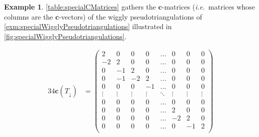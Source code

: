 \documentclass{amsart}
\theoremstyle{definition}
\newtheorem{example}[theorem]{Example}
\renewcommand{\b}[1]{{\boldsymbol{#1}}} %
\newcommand{\ie}{\textit{i.e.}~} %
\begin{document}
\begin{example}
\label{exm:specialCMatrices}
\cref{table:specialCMatrices} gathers the $\b{c}$-matrices (\ie matrices whose columns are the $\b{c}$-vectors) of the wiggly pseudotriangulations of \cref{exm:specialWigglyPseudotriangulations} illustrated in \cref{fig:specialWigglyPseudotriangulations}.

\begin{table}
	\begingroup
	\setlength\arraycolsep{1.1pt}
	\begin{alignat*}{3}
	4\b{c}(T_\downarrow) & = \begin{pmatrix}
		2 & 0 & 0 & 0 & \dots & 0 & 0 & 0 \\
		-2 & 2 & 0 & 0 & \dots & 0 & 0 & 0 \\
		0 & -1 & 2 & 0 & \dots & 0 & 0 & 0 \\
		0 & -1 & -2 & 2 & \dots & 0 & 0 & 0 \\
		0 & 0 & 0 & -1 & \dots & 0 & 0 & 0 \\
		\vdots & \vdots & \vdots & \vdots & \ddots & \vdots & \vdots & \vdots \\
		0 & 0 & 0 & 0 & \dots & 0 & 0 & 0 \\
		0 & 0 & 0& 0 & \dots & 2 & 0 & 0 \\
		0 & 0 & 0 & 0 & \dots & -2 & 2 & 0 \\
		0 & 0 & 0 & 0 & \dots & 0 & -1 & 2 \\

\end{pmatrix}
\end{alignat*}
\end{table}
\end{example}
\end{document}
